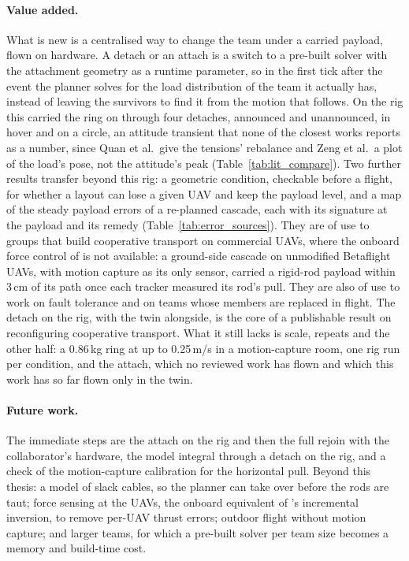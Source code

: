 \paragraph{Value added.} What is new is a centralised way to change the team under a carried payload, flown
on hardware. A detach or an attach is a switch to a pre-built solver with the attachment geometry as a runtime
parameter, so in the first tick after the event the planner solves for the load distribution of the team it
actually has, instead of leaving the survivors to find it from the motion that follows. On the rig this carried
the ring on through four detaches, announced and unannounced, in hover and on a circle, an attitude transient that none of
the closest works reports as a number, since Quan et al.\ give the tensions' rebalance and Zeng et al.\ a plot of
the load's pose, not the attitude's peak (Table~\ref{tab:lit_compare}). Two further results transfer beyond this rig: a
geometric condition, checkable before a flight, for whether a layout can lose a given UAV and keep the payload
level, and a map of the steady payload errors of a re-planned cascade, each with its signature at the payload and
its remedy (Table~\ref{tab:error_sources}). They are of use to groups that build cooperative transport on
commercial UAVs, where the onboard force control of \cite{tudelft} is not available: a ground-side cascade on
unmodified Betaflight UAVs, with motion capture as its only sensor, carried a rigid-rod payload within 3\,cm of its
path once each tracker measured its rod's pull. They are also of use to work on fault tolerance and on teams whose
members are replaced in flight. The detach on the rig, with the twin alongside, is the core of a publishable result
on reconfiguring cooperative transport. What it still lacks is scale, repeats and the other half: a 0.86\,kg ring
at up to 0.25\,m/s in a motion-capture room, one rig run per condition, and the attach, which no reviewed work has
flown and which this work has so far flown only in the twin.

\paragraph{Future work.} The immediate steps are the attach on the rig and then the full rejoin with
the collaborator's hardware, the model integral through a detach on the rig, and a check of the
motion-capture calibration for the horizontal pull. Beyond this thesis: a model of slack cables,
so the planner can take over before the rods are taut; force sensing at the UAVs, the onboard
equivalent of \cite{tudelft}'s incremental inversion, to remove per-UAV thrust errors; outdoor
flight without motion capture; and larger teams, for which a pre-built solver per team size becomes
a memory and build-time cost.

